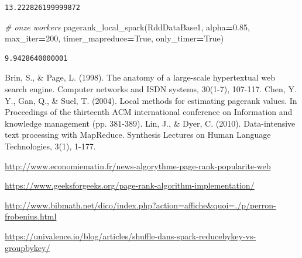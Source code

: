 \documentclass[10pt,a4paper]{article}
\newenvironment{Shaded}{\begin{snugshade}}{\end{snugshade}}
\newcommand{\CommentTok}[1]{\textcolor[rgb]{0.56,0.35,0.01}{\textit{#1}}}
\newcommand{\DecValTok}[1]{\textcolor[rgb]{0.00,0.00,0.81}{#1}}
\newcommand{\FloatTok}[1]{\textcolor[rgb]{0.00,0.00,0.81}{#1}}
\newcommand{\NormalTok}[1]{#1}
\newcommand{\OperatorTok}[1]{\textcolor[rgb]{0.81,0.36,0.00}{\textbf{#1}}}
\newcommand{\VariableTok}[1]{\textcolor[rgb]{0.00,0.00,0.00}{#1}}
\theoremstyle{break}
\begin{document}
\begin{verbatim}
13.222826199999872
\end{verbatim}

\begin{Shaded}
\begin{Highlighting}[]
\CommentTok{# onze workers}
\NormalTok{pagerank_local_spark(RddDataBase1, alpha}\OperatorTok{=}\FloatTok{0.85}\NormalTok{, max_iter}\OperatorTok{=}\DecValTok{200}\NormalTok{,}
\NormalTok{                     timer_mapreduce}\OperatorTok{=}\VariableTok{True}\NormalTok{, only_timer}\OperatorTok{=}\VariableTok{True}\NormalTok{)}
\end{Highlighting}
\end{Shaded}

\begin{verbatim}
9.9428640000001
\end{verbatim}

\nocite{*}

\begin{thebibliography}{999}
 Brin, S., \& Page, L. (1998). The anatomy of a large-scale hypertextual web search engine. Computer networks and ISDN systems, 30(1-7), 107-117.
 Chen, Y. Y., Gan, Q., \& Suel, T. (2004). Local methods for estimating pagerank values. In Proceedings of the thirteenth ACM international conference on Information and knowledge management (pp. 381-389).
 Lin, J., \& Dyer, C. (2010). Data-intensive text processing with MapReduce. Synthesis Lectures on Human Language Technologies, 3(1), 1-177.
\end{thebibliography}

\url{http://www.economiematin.fr/news-algorythme-page-rank-popularite-web}

\url{https://www.geeksforgeeks.org/page-rank-algorithm-implementation/}

\url{http://www.bibmath.net/dico/index.php?action=affiche&quoi=./p/perron-frobenius.html}

\url{https://univalence.io/blog/articles/shuffle-dans-spark-reducebykey-vs-groupbykey/}
\end{document}
